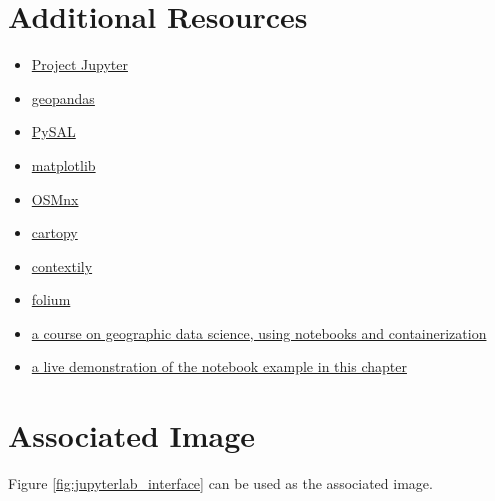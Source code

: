 \documentclass[11pt,letterpaper]{article}
\begin{document}
\section*{Additional Resources}

\begin{itemize}
    \item \href{https://jupyter.org/}{Project Jupyter}
    \item \href{https://geopandas.org/}{geopandas}
    \item \href{https://pysal.org/}{PySAL}
    \item \href{https://matplotlib.org/}{matplotlib}
    \item \href{https://osmnx.readthedocs.io/}{OSMnx}
    \item \href{https://scitools.org.uk/cartopy/docs/latest/}{cartopy}
    \item \href{https://contextily.readthedocs.io/}{contextily}
    \item \href{https://python-visualization.github.io/folium/}{folium}
    \item \href{https://darribas.org/gds_course}{a course on geographic data science, using notebooks and containerization}
    \item \href{https://github.com/darribas/bok_chapter_notebooks}{a live demonstration of the notebook example in this chapter}
\end{itemize}

\section*{Associated Image}

Figure \ref{fig:jupyterlab_interface} can be used as the associated image.
\end{document}
